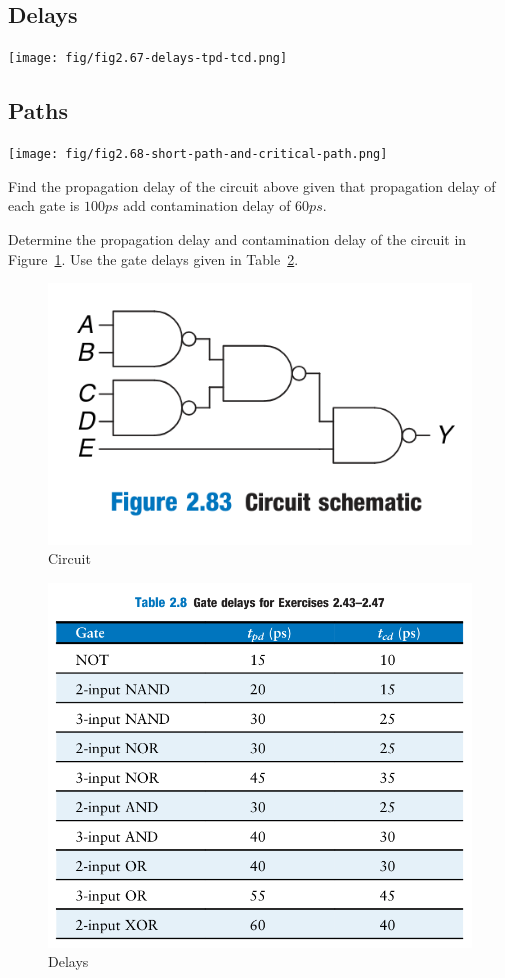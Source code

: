 \subsection{Delays}
\texttt{[image: fig/fig2.67-delays-tpd-tcd.png]}
\begin{definition}
\end{definition}
\vspace{5em}

\begin{definition}
\end{definition}
\vspace{5em}

\subsection{Paths}
\texttt{[image: fig/fig2.68-short-path-and-critical-path.png]}
\begin{example}
  Find the propagation delay of the circuit above given that propagation delay
  of each gate is $100 ps$  add contamination delay of $60ps$.
\end{example}
\vspace{10em}


\begin{example}
Determine the propagation delay and contamination delay of the
circuit in Figure~\ref{fig:2.83}. Use the gate delays given in Table~\ref{tab:2.8}.
\end{example}
\begin{figure}[h!]
  \includegraphics[width=0.5\linewidth]{fig/fig-2.83.png}
  \caption{Circuit}
  \label{fig:2.83}
\end{figure}
\begin{figure}[h!]
  \includegraphics[width=0.5\linewidth]{fig/table-2.8.png}
  \caption{Delays}
  \label{tab:2.8}
\end{figure}
\vspace{10em}

